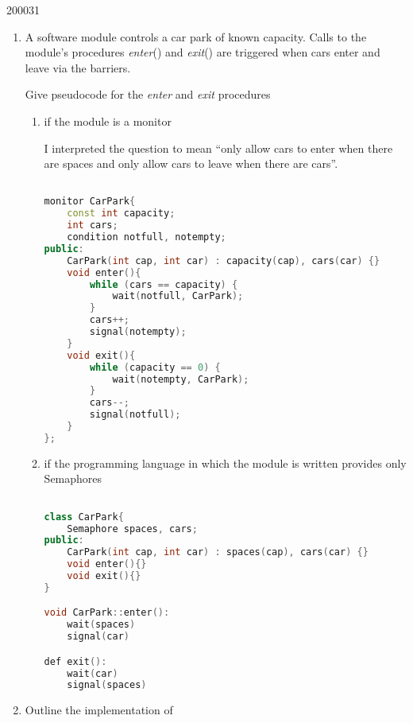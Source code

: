 \documentclass[10pt,\jkfside,a4paper]{article}
\begin{document}
\begin{examquestion}{2000}{3}{1}

\begin{enumerate}[label=(\alph*)]

\item A software module controls a car park of known capacity. Calls to the
module's procedures \textit{enter}() and \textit{exit}() are triggered when
cars enter and leave via the barriers.

Give pseudocode for the \textit{enter} and \textit{exit} procedures

\begin{enumerate}[label=(\roman*)]

\item if the module is a monitor

I interpreted the question to mean ``only allow cars to enter when there are
spaces and only allow cars to leave when there are cars''.

\begin{lstlisting}[language=C++]

monitor CarPark{
	const int capacity;
	int cars;
	condition notfull, notempty;
public:
	CarPark(int cap, int car) : capacity(cap), cars(car) {}
	void enter(){
		while (cars == capacity) {
			wait(notfull, CarPark);
		}
		cars++;
		signal(notempty);
	}
	void exit(){
		while (capacity == 0) {
			wait(notempty, CarPark);
		}
		cars--;
		signal(notfull);
	}
};
\end{lstlisting}

\item if the programming language in which the module is written provides
only Semaphores

\begin{lstlisting}[language=C++]

class CarPark{
	Semaphore spaces, cars;
public:
	CarPark(int cap, int car) : spaces(cap), cars(car) {}
	void enter(){}
	void exit(){}
}

void CarPark::enter():
	wait(spaces)
	signal(car)

def exit():
	wait(car)
	signal(spaces)

\end{lstlisting}

\end{enumerate}

\item Outline the implementation of

\begin{enumerate}[label=(\roman*)]


\end{enumerate}
\end{enumerate}
\end{examquestion}
\end{document}

